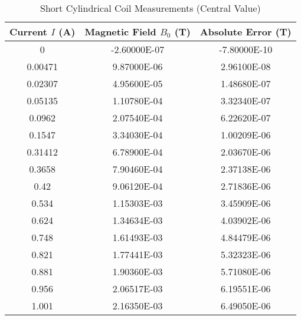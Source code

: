 \begin{appendix}
	\begin{table}[H]
		\centering
		\begin{tabular}{c|c|c}
			Current $I$ (A) & Magnetic Field $B_0$ (T) & Absolute Error (T) \\
			\hline\hline
			0 & -2.60000E-07 & -7.80000E-10 \\ \hline
			0.00471 & 9.87000E-06 & 2.96100E-08 \\ \hline
			0.02307 & 4.95600E-05 & 1.48680E-07 \\ \hline
			0.05135 & 1.10780E-04 & 3.32340E-07 \\ \hline
			0.0962 & 2.07540E-04 & 6.22620E-07 \\ \hline
			0.1547 & 3.34030E-04 & 1.00209E-06 \\ \hline
			0.31412 & 6.78900E-04 & 2.03670E-06 \\ \hline
			0.3658 & 7.90460E-04 & 2.37138E-06 \\ \hline
			0.42 & 9.06120E-04 & 2.71836E-06 \\ \hline
			0.534 & 1.15303E-03 & 3.45909E-06 \\ \hline
			0.624 & 1.34634E-03 & 4.03902E-06 \\ \hline
			0.748 & 1.61493E-03 & 4.84479E-06 \\ \hline
			0.821 & 1.77441E-03 & 5.32323E-06 \\ \hline
			0.881 & 1.90360E-03 & 5.71080E-06 \\ \hline
			0.956 & 2.06517E-03 & 6.19551E-06 \\ \hline
			1.001 & 2.16350E-03 & 6.49050E-06 \\ \hline
		\end{tabular}
		\caption{Short Cylindrical Coil Measurements (Central Value)}
		\label{tab:Short_Cylindrical_Coil_Measurements_Central_Value}
	\end{table}


\end{appendix}
